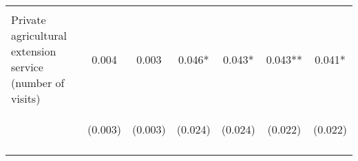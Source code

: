 \begin{center}
\begin{tabular}{lcccccc}
\vspace{4pt} & \begin{footnotesize}[0.387]\end{footnotesize} & \begin{footnotesize}[0.206]\end{footnotesize} & \begin{footnotesize}[0.133]\end{footnotesize} & \begin{footnotesize}[0.247]\end{footnotesize} & \begin{footnotesize}[0.091]\end{footnotesize} & \begin{footnotesize}[0.176]\end{footnotesize} \\
Private agricultural extension service (number of visits) & 0.004 & 0.003 & 0.046* & 0.043* & 0.043** & 0.041* \\
 & \begin{footnotesize}(0.003)\end{footnotesize} & \begin{footnotesize}(0.003)\end{footnotesize} & \begin{footnotesize}(0.024)\end{footnotesize} & \begin{footnotesize}(0.024)\end{footnotesize} & \begin{footnotesize}(0.022)\end{footnotesize} & \begin{footnotesize}(0.022)\end{footnotesize} \\
\vspace{4pt} & \begin{footnotesize}[0.298]\end{footnotesize} & \begin{footnotesize}[0.320]\end{footnotesize} & \begin{footnotesize}[0.053]\end{footnotesize} & \begin{footnotesize}[0.066]\end{footnotesize} & \begin{footnotesize}[0.049]\end{footnotesize} & \begin{footnotesize}[0.061]\end{footnotesize} \\

\end{tabular}
\end{center}
